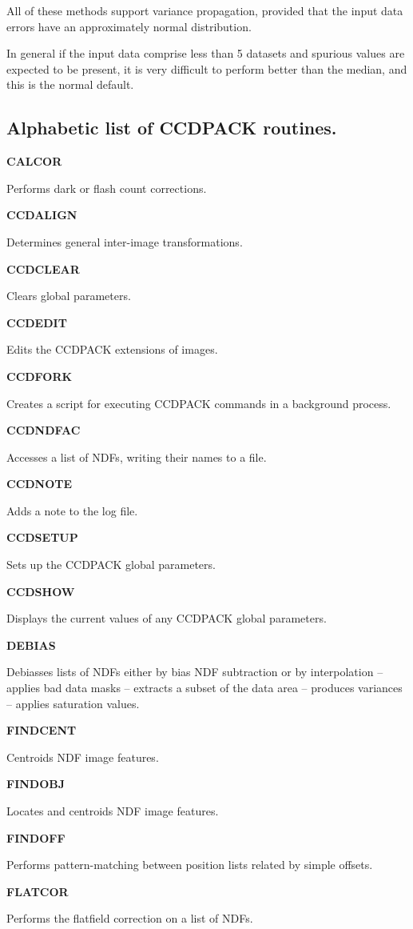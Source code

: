 \documentclass[twoside,11pt]{article}
\newenvironment{latexonly}{}{}
\renewcommand{\_}{\texttt{\symbol{95}}}
\newcommand{\quickdes}[3]{
                         \parbox{1.1in}{\bf #1}
                         \parbox{4.4in}{\raggedright #2 \dotfill}
                         \parbox{0.6in}{\pageref{#3}}
                         \vspace*{0.2in}}
\newcommand{\latexonlysubsection}[1]{\subsection{#1}}
\newcommand{\latexonlysubsection}[1]{#1}
\begin{document}
All of these methods support variance propagation, provided that the
input data errors have an approximately normal distribution.

In general if the input data comprise less than 5 datasets and spurious
values are expected to be present, it is very difficult to perform
better than the median, and this is the normal default.

\newpage
\begin{latexonly}
\latexonlysubsection{Alphabetic list of CCDPACK routines.}
%
%
\quickdes{CALCOR}{Performs dark or flash count corrections.}{CALCOR}

\quickdes{CCDALIGN}{Determines general inter-image transformations.}
         {CCDALIGN}

\quickdes{CCDCLEAR}{Clears global parameters.}
         {CCDCLEAR}

\quickdes{CCDEDIT}{Edits the CCDPACK extensions of images.}
         {CCDEDIT}

\quickdes{CCDFORK}{Creates a script for executing CCDPACK
                   commands in a background process.}{CCDFORK}

\quickdes{CCDNDFAC}{Accesses a list of NDFs, writing their names to a file.}
         {CCDNDFAC}

\quickdes{CCDNOTE}{Adds a note to the log file.}{CCDNOTE}

\quickdes{CCDSETUP}{Sets up the CCDPACK global parameters.}{CCDSETUP}

\quickdes{CCDSHOW}{Displays the current values of any CCDPACK global
                   parameters.}{CCDSHOW}

\quickdes{DEBIAS}{Debiasses lists of NDFs either by bias NDF
                 subtraction or by interpolation --
                 applies bad data masks --
                 extracts a subset of the data area --
                 produces variances --
                 applies saturation values.}
                 {DEBIAS}

\quickdes{FINDCENT}{Centroids NDF image features.}
                   {FINDCENT}

\quickdes{FINDOBJ}{Locates and centroids NDF image features.}
                  {FINDOBJ}

\quickdes{FINDOFF}{Performs pattern-matching between position lists
                   related by simple offsets.}
                   {FINDOFF}

\quickdes{FLATCOR}{Performs the flatfield correction on a list of NDFs.}
                  {FLATCOR}


\end{latexonly}
\end{document}
